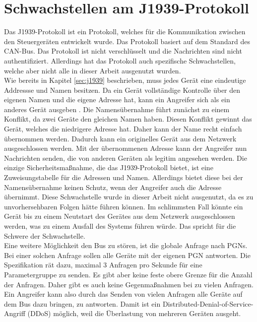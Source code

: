 \section{Schwachstellen am J1939-Protokoll}
Das J1939-Protokoll ist ein Protokoll, welches für die Kommunikation zwischen den Steuergeräten
entwickelt wurde. Das Protokoll basiert auf dem Standard des CAN-Bus. Das Protokoll ist nicht verschlüsselt und die Nachrichten
sind nicht authentifiziert. 
Allerdings hat das Protokoll auch spezifische Schwachstellen, welche aber nicht alle in dieser Arbeit ausgenutzt wurden.\\
Wie bereits in Kapitel \ref{sec:j1939} beschrieben, muss jedes Gerät eine eindeutige Addressse und Namen besitzen.
Da ein Gerät vollständige Kontrolle über 
den eigenen Namen und die eigene Adresse hat, kann ein Angreifer sich als ein anderes Gerät ausgeben \cite{Murvay2018}. 
Die Namensübernahme führt
zunächst zu einem Konflikt, da zwei Geräte den gleichen Namen haben. Diesen Konflikt gewinnt das Gerät, welches die niedrigere
Adresse hat. Daher kann der Name recht einfach übernommen werden. Dadurch kann ein originelles Gerät aus dem Netzwerk ausgeschlossen
werden. Mit der übernommenen Adresse kann der Angreifer nun Nachrichten senden, die von anderen Geräten als legitim angesehen werden.
Die einzige Sicherheitsmaßnahme, die das J1939-Protokoll bietet, ist eine Zuweisungstabelle für die Adressen und Namen. Allerdings
bietet diese bei der Namensübernahme keinen Schutz, wenn der Angreifer auch die Adresse übernimmt. Diese Schwachstelle 
wurde in dieser Arbeit nicht ausgenutzt, da es zu unvorhersehbaren Folgen hätte führen können. 
Im schlimmsten Fall könnte ein Gerät bis zu einem Neutstart des Gerätes aus dem Netzwerk ausgeschlossen werden, 
was zu einem Ausfall des Systems führen würde.
Das spricht für die Schwere der Schwachstelle.\\
Eine weitere Möglichkeit den Bus zu stören, ist die globale Anfrage nach PGNs. Bei einer solchen Anfrage sollen alle Geräte
mit der eigenen PGN antworten. Die Spezifikation rät dazu, maximal 3 Anfragen pro Sekunde für eine Parametergruppe zu senden.
Es gibt aber keine feste obere Grenze für die Anzahl der Anfragen. Daher gibt es auch keine Gegenmaßnahmen bei zu vielen 
Anfragen. Ein Angreifer kann also durch das Senden von vielen Anfragen alle Geräte auf dem Bus dazu bringen, zu antworten.
Damit ist ein Distributed-Denial-of-Service-Angriff (DDoS) möglich, weil die Überlastung von mehreren Geräten ausgeht. \\


